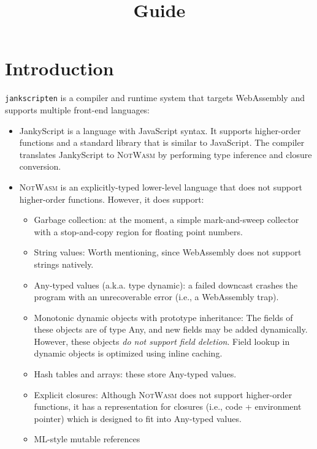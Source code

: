 \documentclass{article}
\title{\system Guide}
\newcommand{\system}{\texttt{jankscripten}\xspace}
\newcommand{\notwasm}{\textsc{NotWasm}\xspace}
\newcommand{\jankyscript}{JankyScript\xspace}
\begin{document}
\maketitle

\tableofcontents

\section{Introduction}

\system is a compiler and runtime system that targets WebAssembly and supports
multiple front-end languages:

\begin{itemize}

\item \jankyscript is a language with JavaScript syntax. It supports
higher-order functions and a standard library that is similar to JavaScript.
The compiler translates JankyScript to \notwasm by performing type inference
and closure conversion.

\item \notwasm is an explicitly-typed lower-level language that does not
support higher-order functions. However, it does support:
  
\begin{itemize}

\item Garbage collection: at the moment, a simple mark-and-sweep collector with
a stop-and-copy region for floating point numbers.

\item String values: Worth mentioning, since WebAssembly does not support
strings natively.

\item Any-typed values (a.k.a. type dynamic): a failed downcast crashes the
program with an unrecoverable error (i.e., a WebAssembly trap).

\item Monotonic dynamic objects with prototype inheritance: The fields of these
objects are of type Any, and new fields may be added dynamically. However,
these objects \emph{do not support field deletion}. Field lookup in dynamic
objects is optimized using inline caching.

\item Hash tables and arrays: these store Any-typed values.

\item Explicit closures: Although \notwasm does not support higher-order
functions, it has a representation for closures (i.e., code + environment
pointer) which is designed to fit into Any-typed values.

\item ML-style mutable references

\end{itemize}

\end{itemize}
\end{document}
